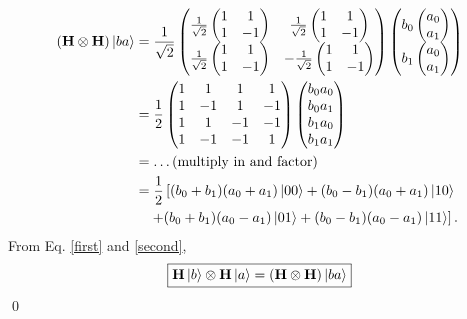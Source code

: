 \documentclass{book}
\theoremstyle{definition}
\newcommand{\nn}{\nonumber}
\newcommand{\f}[2]{\frac{#1}{#2}}
\newcommand{\lb}{\left[}
\newcommand{\rb}{\right]}
\newcommand{\had}{\mathbf{H}}
\begin{document}
\begin{align}\label{second}
(\had\otimes \had)\ket{ba} &= 
\f{1}{\sqrt{2}}\begin{pmatrix}
\f{1}{\sqrt{2}}\begin{pmatrix}
1 & 1 \\ 1 & -1
\end{pmatrix} & \f{1}{\sqrt{2}}\begin{pmatrix}
1 & 1 \\ 1 & -1
\end{pmatrix}\\
\f{1}{\sqrt{2}}\begin{pmatrix}
1 & 1 \\ 1 & -1
\end{pmatrix} & -\f{1}{\sqrt{2}}\begin{pmatrix}
1 & 1 \\ 1 & -1
\end{pmatrix}
\end{pmatrix}\begin{pmatrix}
b_0\begin{pmatrix}
a_0\\a_1
\end{pmatrix}\\
b_1\begin{pmatrix}
a_0\\a_1
\end{pmatrix}
\end{pmatrix} \nn\\
&= \f{1}{2}\begin{pmatrix}
1&1&1&1\\
1&-1&1&-1\\
1&1&-1&-1\\
1&-1&-1&1
\end{pmatrix}\begin{pmatrix}
b_0a_0\\b_0a_1\\b_1a_0\\b_1a_1
\end{pmatrix}\nn\\
&= \dots \text{(multiply in and factor)}\nn\\
&= \f{1}{2}\lb (b_0+b_1)(a_0+a_1)\ket{00} + (b_0-b_1)(a_0+a_1)\ket{10}\right. \nn\\
&\left.\quad + (b_0+b_1)(a_0-a_1)\ket{01} + (b_0-b_1)(a_0-a_1)\ket{11} \rb.
\end{align}
From Eq. \eqref{first} and \eqref{second}, 
\begin{align}
\boxed{\had \ket{b}\otimes \had \ket{a} = (\had\otimes \had)\ket{ba}}
\end{align}\qed
\end{document}
